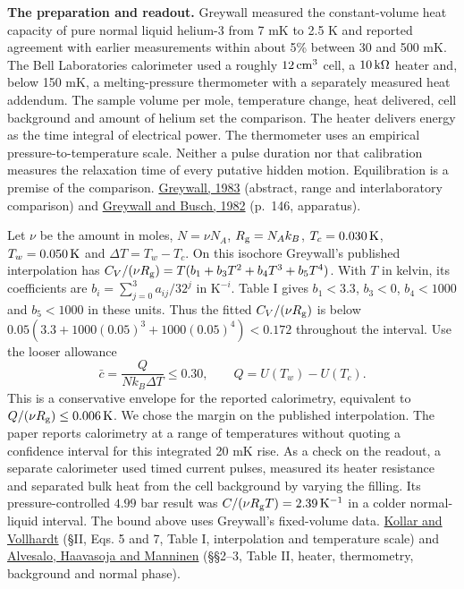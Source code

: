 \documentclass[11pt,a4paper]{article}
\begin{document}
\textbf{The preparation and readout.} Greywall measured the
constant-volume heat capacity of pure normal liquid helium-3 from 7 mK
to 2.5 K and reported agreement with earlier measurements within about
5\% between 30 and 500 mK. The Bell Laboratories calorimeter used a
roughly \(12\,{\rm cm^3}\) cell, a \(10\,{\rm k\Omega}\) heater and,
below 150 mK, a melting-pressure thermometer with a separately measured
heat addendum. The sample volume per mole, temperature change, heat
delivered, cell background and amount of helium set the comparison. The
heater delivers energy as the time integral of electrical power. The
thermometer uses an empirical pressure-to-temperature scale. Neither a
pulse duration nor that calibration measures the relaxation time of
every putative hidden motion. Equilibration is a premise of the
comparison. \href{https://doi.org/10.1103/PhysRevB.27.2747}{Greywall,
1983} (abstract, range and interlaboratory comparison) and
\href{https://doi.org/10.1103/PhysRevLett.49.146}{Greywall and Busch,
1982} (p.~146, apparatus).

Let \(\nu\) be the amount in moles, \(N=\nu N_A\), \(R_{\rm g}=N_Ak_B\),
\(T_c=0.030\,{\rm K}\), \(T_w=0.050\,{\rm K}\) and \(\Delta T=T_w-T_c\).
On this isochore Greywall's published interpolation has
\(C_V/(\nu R_{\rm g})=T(b_1+b_3T^2+b_4T^3+b_5T^4)\). With \(T\) in
kelvin, its coefficients are \(b_i=\sum_{j=0}^3 a_{ij}/32^j\) in
\(\mathrm{K}^{-i}\). Table I gives \(b_1<3.3\), \(b_3<0\), \(b_4<1000\)
and \(b_5<1000\) in these units. Thus the fitted \(C_V/(\nu R_{\rm g})\)
is below \(0.05(3.3+1000(0.05)^3+1000(0.05)^4)<0.172\) throughout the
interval. Use the looser allowance \[
 \bar c=\frac{Q}{N k_B\Delta T}\le 0.30,\qquad
 Q=U(T_w)-U(T_c).
\] This is a conservative envelope for the reported calorimetry,
equivalent to \(Q/(\nu R_{\rm g})\le0.006\,{\rm K}\). We chose the
margin on the published interpolation. The paper reports calorimetry at
a range of temperatures without quoting a confidence interval for this
integrated 20 mK rise. As a check on the readout, a separate calorimeter
used timed current pulses, measured its heater resistance and separated
bulk heat from the cell background by varying the filling. Its
pressure-controlled \(4.99\) bar result was
\(C/(\nu R_{\rm g}T)=2.39\,{\rm K}^{-1}\) in a colder normal-liquid
interval. The bound above uses Greywall's fixed-volume data.
\href{https://arxiv.org/html/cond-mat/9906222}{Kollar and Vollhardt}
(§II, Eqs. 5 and 7, Table I, interpolation and temperature scale) and
\href{https://doi.org/10.1007/BF00655140}{Alvesalo, Haavasoja and
Manninen} (§§2--3, Table II, heater, thermometry, background and normal
phase).
\end{document}

